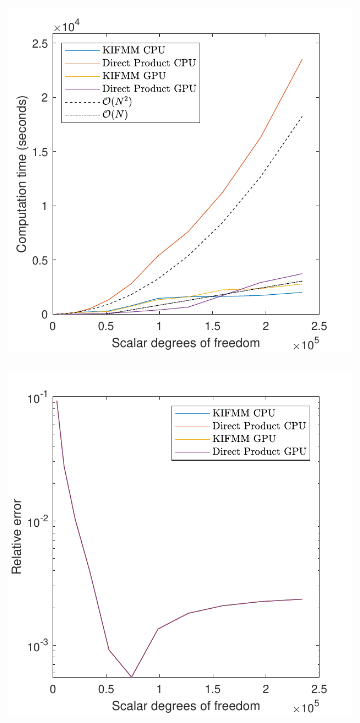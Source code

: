 \begin{figure}[ht]
     \centering
     \begin{subfigure}[b]{0.49\textwidth}
         \centering
         \includegraphics[width=\textwidth]{Images/KIFMM/Graphs/DirectProductCompTime.pdf}
         \caption{\label{fig:DirectProductCompTime}}
     \end{subfigure}
     \hfill
     \begin{subfigure}[b]{0.49\textwidth}
         \centering
         \includegraphics[width=\textwidth]{Images/KIFMM/Graphs/DirectProductComperror.pdf}

\end{subfigure}
\end{figure}
